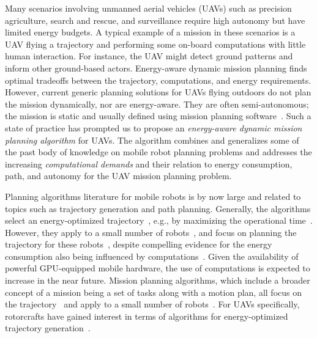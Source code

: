 \documentclass[letterpaper,10pt,conference]{ieeeconf}
\theoremstyle{definition}
\begin{document}
Many scenarios involving unmanned aerial vehicles (UAVs) such as precision agriculture, search and rescue, and surveillance require high autonomy but have limited energy budgets. A typical example of a mission in these scenarios is a UAV flying a trajectory and performing some on-board computations with little human interaction. For instance, the UAV might detect ground patterns and inform other ground-based actors. Energy-aware dynamic mission planning finds optimal tradeoffs between the trajectory, computations, and energy requirements. However, current generic planning solutions for UAVs flying outdoors do not plan the mission dynamically, nor are energy-aware. They are often semi-autonomous; the mission is static and usually defined using mission planning software~\cite{daponte2019review}. Such a state of practice has prompted us to propose an \emph{energy-aware dynamic mission planning algorithm} for UAVs. The algorithm combines and generalizes some of the past body of knowledge on mobile robot planning problems and addresses the increasing \emph{computational demands} and their relation to energy consumption, path, and autonomy for the UAV mission planning problem.

Planning algorithms literature for mobile robots is by now large and related to topics such as trajectory generation and path planning. Generally, the algorithms select an energy-optimized trajectory~\cite{mei2004energy}, e.g., by maximizing the operational time~\cite{wahab2015energy}. However, they apply to a small number of robots~\cite{kim2005energy}, and focus on planning the trajectory for these robots~\cite{kim2008minimum}, despite compelling evidence for the energy consumption also being influenced by computations~\cite{mei2005case}. Given the availability of powerful GPU-equipped mobile hardware, the use of computations is expected to increase in the near future. Mission planning algorithms, which include a broader concept of a mission being a set of tasks along with a motion plan, all focus on the trajectory~\cite{mei2005case,mei2006deployment} and apply to a small number of robots~\cite{sadrpour2013mission,sadrpour2013experimental}. For UAVs specifically, rotorcrafts have gained interest in terms of algorithms for energy-optimized trajectory generation~\cite{morbidi2016minimum,kreciglowa2017energy}. 
\end{document}
